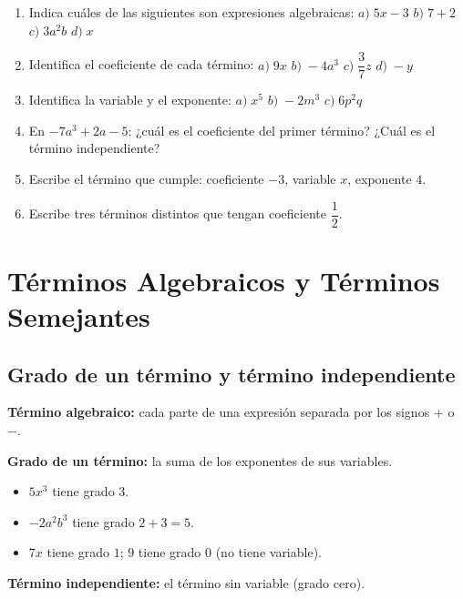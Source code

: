 \documentclass[12pt, letterpaper]{article}
\begin{document}
\begin{enumerate}[leftmargin=*]
  \item \facil{} Indica cuáles de las siguientes son expresiones algebraicas: $a) \; 5x - 3$ \quad $b) \; 7 + 2$ \quad $c) \; 3a^2b$ \quad $d) \; x$

  \item \facil{} Identifica el coeficiente de cada término: $a) \; 9x$ \quad $b) \; -4a^3$ \quad $c) \; \dfrac{3}{7}z$ \quad $d) \; -y$

  \item \facil{} Identifica la variable y el exponente: $a) \; x^5$ \quad $b) \; -2m^3$ \quad $c) \; 6p^2q$

  \item \facil{} En $-7a^3 + 2a - 5$: ¿cuál es el coeficiente del primer término? ¿Cuál es el término independiente?

  \item \medio{} Escribe el término que cumple: coeficiente $-3$, variable $x$, exponente $4$.

  \item \medio{} Escribe tres términos distintos que tengan coeficiente $\dfrac{1}{2}$.
\end{enumerate}

\newpage

\section{Términos Algebraicos y Términos Semejantes}

\subsection{Grado de un término y término independiente}

\begin{cuadroteoria}
  \textbf{Término algebraico:} cada parte de una expresión separada por los signos $+$ o $-$.

  \textbf{Grado de un término:} la suma de los exponentes de sus variables.
  \begin{itemize}[leftmargin=*]
    \item $5x^3$ tiene grado $3$.
    \item $-2a^2b^3$ tiene grado $2 + 3 = 5$.
    \item $7x$ tiene grado $1$; $9$ tiene grado $0$ (no tiene variable).
  \end{itemize}

  \textbf{Término independiente:} el término sin variable (grado cero).
\end{cuadroteoria}
\end{document}
